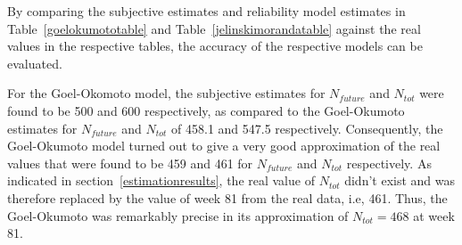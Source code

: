 By comparing the subjective estimates and reliability model estimates in Table~\ref{goelokumototable} and Table~\ref{jelinskimorandatable} against the real values in the respective tables, the accuracy of the respective models can be evaluated. 

For the Goel-Okomoto model, the subjective estimates for $N_{future}$ and $N_{tot}$ were found to be 500 and 600 respectively, as compared to the Goel-Okumoto estimates for $N_{future}$ and $N_{tot}$ of 458.1 and 547.5 respectively. Consequently, the Goel-Okumoto model turned out to give a very good approximation of the real values that were found to be 459 and 461 for $N_{future}$ and $N_{tot}$ respectively. As indicated in section~\ref{estimationresults}, the real value of $N_{tot}$ didn't exist and was therefore replaced by the value of week 81 from the real data, i.e, 461. Thus, the Goel-Okumoto was remarkably precise in its approximation of $N_{tot}=468$ at week 81. 
